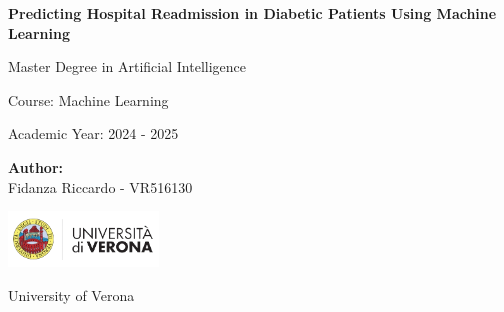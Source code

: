 \documentclass[11pt]{article}
\begin{document}
\begin{titlepage}
    \centering
    {\Huge \textbf{Predicting Hospital Readmission in Diabetic Patients Using Machine Learning} \par}
    \vspace{2cm}
    
    {\Large Master Degree in Artificial Intelligence \par}
    \vspace{0.5cm}
    
    {\Large Course: Machine Learning \par}
    \vspace{0.5cm}
    
    {\Large Academic Year: 2024 - 2025 \par}
    \vfill
    
    \textbf{Author:} \\
    Fidanza Riccardo - VR516130\\
    \vspace{1cm}

    \includegraphics[width=0.3\textwidth]{images/logo.png}
    \vspace{1cm}
    
    {\Large University of Verona \par}
    \vspace{0.5cm}
    
\end{titlepage}


\begin{abstract}
\noindent Diabetes mellitus is a chronic condition frequently associated with hospital readmissions due to challenges in effective disease management. In this study, a subset of the original \textit{Diabetes 130-US hospitals for years 1999–2008} dataset is used to develop and compare machine learning (ML) methods for predicting readmission risk in diabetic patients. The prediction task is formulated as a binary classification to determine whether a patient will be readmitted or not. ML models are trained using the complete feature set as well as after applying feature selection. The goal is to identify effective ML approaches for the early detection of high-risk patients and to facilitate more efficient healthcare research.

\end{abstract}

\tableofcontents  %
\newpage 






\printbibliography
\end{document}
